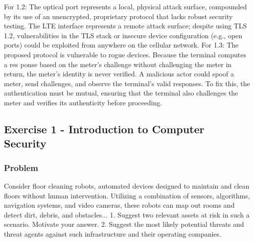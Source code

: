 \documentclass{article}
\begin{document}
For 1.2: The optical port represents a local, physical attack surface, compounded by its use of an unencrypted, proprietary protocol that lacks robust security testing. The LTE interface represents a remote attack surface; despite using TLS 1.2, vulnerabilities in the TLS stack or insecure device configuration (e.g., open ports) could be exploited from anywhere on the cellular network.
For 1.3: The proposed protocol is vulnerable to rogue devices. Because the terminal computes a res  ponse based on the meter's challenge without challenging the meter in return, the meter's identity is never verified. A malicious actor could spoof a meter, send challenges, and observe the terminal's valid responses. To fix this, the authentication must be mutual, ensuring that the terminal also challenges the meter and verifies its authenticity before proceeding.

\subsection{Exercise 1 - Introduction to Computer Security}
\subsubsection*{Problem}
Consider floor cleaning robots, automated devices designed to maintain and clean floors without human intervention. Utilizing a combination of sensors, algorithms, navigation systems, and video cameras, these robots can map out rooms and detect dirt, debris, and obstacles... 1. Suggest two relevant assets at risk in such a scenario. Motivate your answer. 2. Suggest the most likely potential threats and threat agents against such infrastructure and their operating companies.
\end{document}
